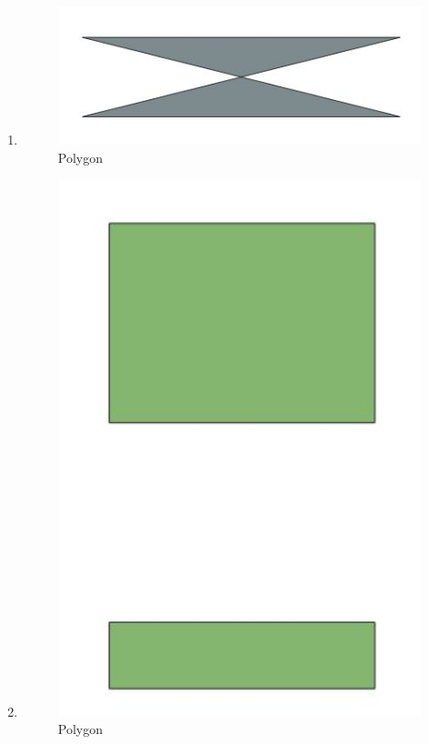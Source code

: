 \begin{enumerate}
	\item 
	
	\begin{figure}[H]
		\includegraphics[width=12cm]{figures/1174042/No8.JPG}
		\centering
		\caption{Polygon}
	\end{figure}
	
	\item 
	
	\begin{figure}[H]
		\includegraphics[width=12cm]{figures/1174042/No9.JPG}
		\centering
		\caption{Polygon}
	\end{figure}
	

\end{enumerate}
